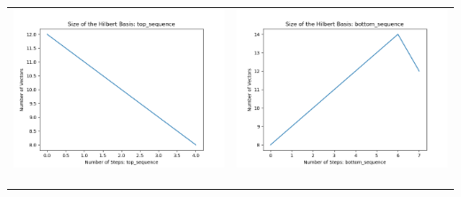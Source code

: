 \documentclass[10pt]{article}
\begin{document}
\begin{tabular}{c|c}
\begin{minipage}{.4\textwidth}
\includegraphics[width=\textwidth]{"DATA/4d/4 generators 2 bound H/top_sequence SIZE"}
\end{minipage} &
\begin{minipage}{.4\textwidth}
\includegraphics[width=\textwidth]{"DATA/4d/4 generators 2 bound H bottomup/bottom_sequence SIZE"}
\end{minipage} \\ \\
\hline \\\begin{minipage}{.4\textwidth}

\end{minipage}
\end{tabular}
\end{document}

